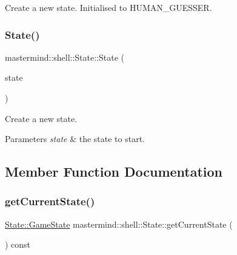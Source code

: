 Create a new state. Initialised to H\+U\+M\+A\+N\+\_\+\+G\+U\+E\+S\+S\+ER. 

\hypertarget{classmastermind_1_1shell_1_1_state_acb7ba3f392b85eec1ae099d2c2b34a89}{}\label{classmastermind_1_1shell_1_1_state_acb7ba3f392b85eec1ae099d2c2b34a89} 
\subsubsection{\texorpdfstring{State()}{State()}\hspace{0.1cm}{\footnotesize\ttfamily [2/2]}}
{\footnotesize\ttfamily mastermind\+::shell\+::\+State\+::\+State (\begin{DoxyParamCaption}\item[{\hyperlink{classmastermind_1_1shell_1_1_state_a7667dd4920335355f616e9ffc2793d0b}{Game\+State}}]{state }\end{DoxyParamCaption})}



Create a new state. 


\begin{DoxyParams}{Parameters}
{\em state} & the state to start. \\
\hline
\end{DoxyParams}


\subsection{Member Function Documentation}
\hypertarget{classmastermind_1_1shell_1_1_state_a271f58e7d38180a9c52ff42e2c7de961}{}\label{classmastermind_1_1shell_1_1_state_a271f58e7d38180a9c52ff42e2c7de961} 
\subsubsection{\texorpdfstring{get\+Current\+State()}{getCurrentState()}}
{\footnotesize\ttfamily \hyperlink{classmastermind_1_1shell_1_1_state_a7667dd4920335355f616e9ffc2793d0b}{State\+::\+Game\+State} mastermind\+::shell\+::\+State\+::get\+Current\+State (\begin{DoxyParamCaption}{ }\end{DoxyParamCaption}) const}



